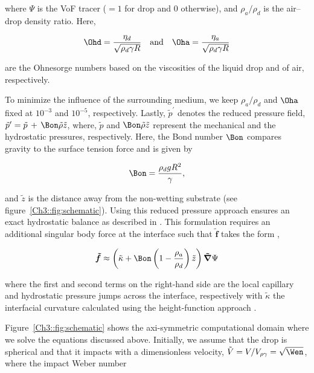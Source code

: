 \noindent where $\Psi$ is the VoF tracer ($= 1$ for drop and $0$ otherwise), and $\rho_a/\rho_d$ is the air--drop density ratio. Here, 

\begin{align}
	\Ohd = \frac{\eta_d}{\sqrt{\rho_d\gamma R}}\quad\text{and}\quad\Oha = \frac{\eta_a}{\sqrt{\rho_d\gamma R}}
\end{align}

\noindent are the Ohnesorge numbers based on the viscosities of the liquid drop and of air, respectively. 

To minimize the influence of the surrounding medium, we keep $\rho_a/\rho_d$ and $\Oha$ fixed at $10^{-3}$ and $10^{-5}$, respectively. Lastly, $\tilde{p}^{\prime}$ denotes the reduced pressure field, $\tilde{p}' = \tilde{p}\,+\,\Bon\tilde{\rho}\tilde{z}$, where, $\tilde{p}$ and $\Bon\tilde{\rho}\tilde{z}$ represent the mechanical and the hydrostatic pressures, respectively. Here, the Bond number $\Bon$ compares gravity to the surface tension force and is given by

\begin{align}
	\Bon = \frac{\rho_dgR^2}{\gamma},
\end{align}

\noindent and $\tilde{z}$ is the distance away from the non-wetting substrate (see figure~\ref{Ch3::fig:schematic}). Using this reduced pressure approach ensures an exact hydrostatic balance as described in \citet{popinet2018numerical, basiliskpopinet3}. This formulation requires an additional singular body force at the interface such that $\boldsymbol{\tilde{f}}$ takes the form \citep{brackbill1992continuum},

\begin{align}
	\boldsymbol{\tilde{f}} \approx \left(\tilde{\kappa} + \Bon\left(1 -\frac{\rho_a}{\rho_d}\right)\tilde{z}\right)\boldsymbol{\tilde{\nabla}}\Psi
\end{align}

\noindent where the first and second terms on the right-hand side are the local capillary and hydrostatic pressure jumps across the interface, respectively with $\tilde{\kappa}$ the interfacial curvature calculated using the height-function approach \citep{popinet2009accurate}. 

Figure~\ref{Ch3::fig:schematic} shows the axi-symmetric computational domain where we solve the equations discussed above. Initially, we assume that the drop is spherical and that it impacts with a dimensionless velocity, $\tilde{V} = V/V_{\rho\gamma} = \sqrt{\Wen}$, where the impact Weber number 

